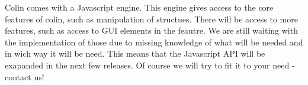 Colin comes with a Javascript engine. This engine gives access to the core features of colin, such as manipulation of structues. There will be access to more features, such as access to GUI elements in the feautre. We are still waiting with the implementation of those due to missing knowledge of what will be needed and in wich way it will be need. This means that the Javascript API will be exapanded in the next few releases. Of course we will try to fit it to your need - contact us!
